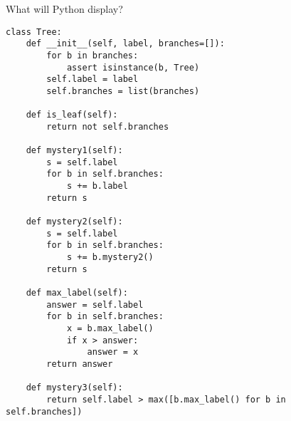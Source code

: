 \begin{blocksection}
\question What will Python display?

\begin{lstlisting}
class Tree:
    def __init__(self, label, branches=[]):
        for b in branches:
            assert isinstance(b, Tree)
        self.label = label
        self.branches = list(branches)

    def is_leaf(self):
        return not self.branches

    def mystery1(self):
        s = self.label
        for b in self.branches:
            s += b.label
        return s

    def mystery2(self):
        s = self.label
        for b in self.branches:
            s += b.mystery2()
        return s

    def max_label(self):
        answer = self.label
        for b in self.branches:
            x = b.max_label()
            if x > answer:
                answer = x
        return answer

    def mystery3(self):
        return self.label > max([b.max_label() for b in self.branches])
\end{lstlisting}
\end{blocksection}

